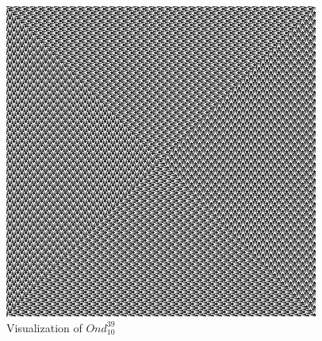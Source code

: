 \documentclass[11pt,reqno]{amsart}
\theoremstyle{mydef}
\begin{document}
\begin{figure}[h]
\centering
\includegraphics[scale=.9]{N10k39a.png}
\caption{Visualization of $Ond^{39}_{10}$}
\label{fig:viz1039}
\end{figure}
\end{document}
